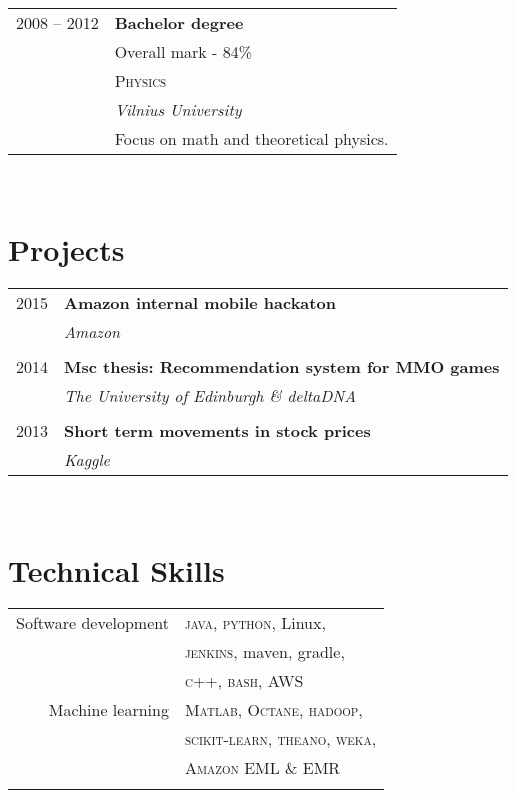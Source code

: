 \documentclass[10pt]{article} %
\begin{document}
{\begin{minipage}[t]{0.44\textwidth}
\begin{tabular}{rl}
2008 -- 2012 & \textbf{Bachelor degree}\\
& \small Overall mark - 84\% \\
& \textsc{Physics} \\ 
& \textit{Vilnius University} \\
& \small Focus on math and theoretical physics. \\
	

\end{tabular}\\[10pt]


\section{Projects} 

\begin{tabular}{rl}

2015     & \textbf{Amazon internal mobile hackaton}\\
& \textit{Amazon}\\
&\\
2014     & \textbf{Msc thesis: Recommendation system for MMO games}\\
& \textit{The University of Edinburgh \& deltaDNA}\\
&\\
2013	 & \textbf{Short term movements in stock prices}\\
& \textit{Kaggle}

\end{tabular}\\[10pt]


\section{Technical Skills} 

\begin{tabular}{rl}
Software development
& \textsc{java}, \textsc{python}, Linux,\\
& \textsc{jenkins}, maven, gradle,\\
& \textsc{c++}, \textsc{bash}, \textsc{AWS}\\
Machine learning
& \textsc{Matlab}, \textsc{Octane}, \textsc{hadoop},\\
& \textsc{scikit-learn}, \textsc{theano}, \textsc{weka},\\
& \textsc{Amazon EML \& EMR} \\
& \\
\end{tabular}


\end{minipage}}
\end{document}
